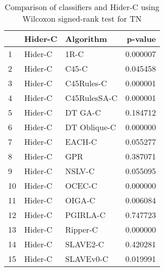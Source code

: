 \begin{table}
\footnotesize
\caption{Comparison of classifiers and Hider-C using Wilcoxon signed-rank test for TN}
\label{tab:Hider-C wilcoxon TN comparison}
\begin{tabular}{lllr}
\hline
 & Hider-C & Algorithm & p-value \\
\hline
1 & Hider-C & 1R-C & 0.000007 \\
2 & Hider-C & C45-C & 0.045458 \\
3 & Hider-C & C45Rules-C & 0.000001 \\
4 & Hider-C & C45RulesSA-C & 0.000001 \\
5 & Hider-C & DT GA-C & 0.184712 \\
6 & Hider-C & DT Oblique-C & 0.000000 \\
7 & Hider-C & EACH-C & 0.055277 \\
8 & Hider-C & GPR & 0.387071 \\
9 & Hider-C & NSLV-C & 0.055095 \\
10 & Hider-C & OCEC-C & 0.000000 \\
11 & Hider-C & OIGA-C & 0.006084 \\
12 & Hider-C & PGIRLA-C & 0.747723 \\
13 & Hider-C & Ripper-C & 0.000000 \\
14 & Hider-C & SLAVE2-C & 0.420281 \\
15 & Hider-C & SLAVEv0-C & 0.019991 \\
\hline
\end{tabular}
\end{table}
